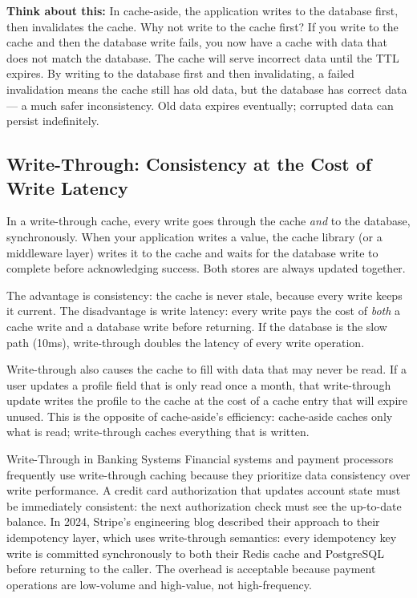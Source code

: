 \documentclass[11pt,a4paper]{article}
\begin{document}
\begin{thinkbox}
\textbf{Think about this:} In cache-aside, the application writes to the database first, then invalidates the cache. Why not write to the cache first? If you write to the cache and then the database write fails, you now have a cache with data that does not match the database. The cache will serve incorrect data until the TTL expires. By writing to the database first and then invalidating, a failed invalidation means the cache still has old data, but the database has correct data --- a much safer inconsistency. Old data expires eventually; corrupted data can persist indefinitely.
\end{thinkbox}

\subsection{Write-Through: Consistency at the Cost of Write Latency}

In a write-through cache, every write goes through the cache \emph{and} to the database, synchronously. When your application writes a value, the cache library (or a middleware layer) writes it to the cache and waits for the database write to complete before acknowledging success. Both stores are always updated together.

The advantage is consistency: the cache is never stale, because every write keeps it current. The disadvantage is write latency: every write pays the cost of \emph{both} a cache write and a database write before returning. If the database is the slow path (10ms), write-through doubles the latency of every write operation.

Write-through also causes the cache to fill with data that may never be read. If a user updates a profile field that is only read once a month, that write-through update writes the profile to the cache at the cost of a cache entry that will expire unused. This is the opposite of cache-aside's efficiency: cache-aside caches only what is read; write-through caches everything that is written.

\begin{industrybox}{Write-Through in Banking Systems}
Financial systems and payment processors frequently use write-through caching because they prioritize data consistency over write performance. A credit card authorization that updates account state must be immediately consistent: the next authorization check must see the up-to-date balance. In 2024, Stripe's engineering blog described their approach to their idempotency layer, which uses write-through semantics: every idempotency key write is committed synchronously to both their Redis cache and PostgreSQL before returning to the caller. The overhead is acceptable because payment operations are low-volume and high-value, not high-frequency.
\end{industrybox}
\end{document}
